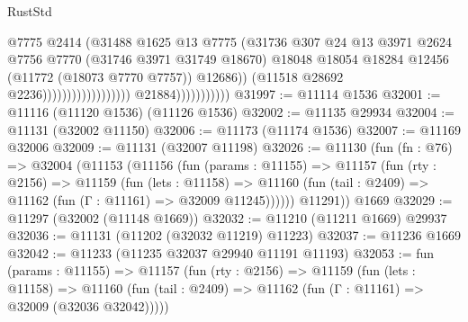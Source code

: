 \begin{lexlean}{RustStd}
\begin{coremodule}
                                                            @7775
                                                            @2414
                                                            (@31488
                                                              @1625
                                                              @13
                                                              @7775
                                                              (@31736
                                                                @307
                                                                @24
                                                                @13
                                                                @3971
                                                                @2624
                                                                @7756
                                                                @7770
                                                                (@31746 @3971 @31749 @18670)
                                                                @18048
                                                                @18054
                                                                @18284
                                                                @12456
                                                                (@11772 (@18073 @7770 @7757))
                                                                @12686))
                                                            (@11518 @28692 @2236))))))))))))))))))
                          @21884)))))))))))
@31997 := @11114 @1536
@32001 := @11116 (@11120 @1536) (@11126 @1536)
@32002 := @11135 @29934
@32004 := @11131 (@32002 @11150)
@32006 := @11173 (@11174 @1536)
@32007 := @11169 @32006
@32009 := @11131 (@32007 @11198)
@32026 := @11130
    (fun (fn : @76) =>
    @32004
      (@11153
        (@11156
          (fun (params : @11155) =>
          @11157
            (fun (rty : @2156) =>
            @11159
              (fun (lets : @11158) =>
              @11160 (fun (tail : @2409) => @11162 (fun (Γ : @11161) => @32009 @11245))))))
        @11291))
    @1669
@32029 := @11297 (@32002 (@11148 @1669))
@32032 := @11210 (@11211 @1669) @29937
@32036 := @11131 (@11202 (@32032 @11219) @11223)
@32037 := @11236 @1669
@32042 := @11233 (@11235 @32037 @29940 @11191 @11193)
@32053 := fun (params : @11155) =>
  @11157
    (fun (rty : @2156) =>
    @11159
      (fun (lets : @11158) =>
      @11160 (fun (tail : @2409) => @11162 (fun (Γ : @11161) => @32009 (@32036 @32042)))))

\end{coremodule}
\end{lexlean}
